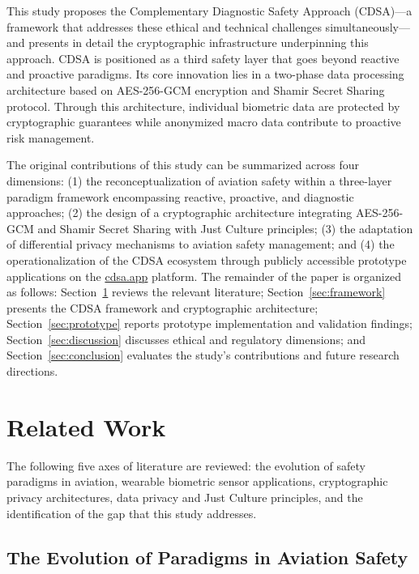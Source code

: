 \documentclass[12pt,a4paper]{article}
\begin{document}
This study proposes the Complementary Diagnostic Safety Approach (CDSA)---a framework that
addresses these ethical and technical challenges simultaneously---and presents in detail the
cryptographic infrastructure underpinning this approach. CDSA is positioned as a third safety
layer that goes beyond reactive and proactive paradigms. Its core innovation lies in a two-phase
data processing architecture based on AES-256-GCM encryption and Shamir Secret Sharing protocol.
Through this architecture, individual biometric data are protected by cryptographic guarantees
while anonymized macro data contribute to proactive risk management.

The original contributions of this study can be summarized across four dimensions:
(1) the reconceptualization of aviation safety within a three-layer paradigm framework
encompassing reactive, proactive, and diagnostic approaches;
(2) the design of a cryptographic architecture integrating AES-256-GCM and Shamir Secret
Sharing with Just Culture principles;
(3) the adaptation of differential privacy mechanisms to aviation safety management; and
(4) the operationalization of the CDSA ecosystem through publicly accessible prototype
applications on the \href{https://cdsa.app}{cdsa.app} platform.
The remainder of the paper is organized as follows: Section~\ref{sec:related} reviews the
relevant literature; Section~\ref{sec:framework} presents the CDSA framework and cryptographic
architecture; Section~\ref{sec:prototype} reports prototype implementation and validation findings;
Section~\ref{sec:discussion} discusses ethical and regulatory dimensions; and
Section~\ref{sec:conclusion} evaluates the study's contributions and future research directions.

\section{Related Work}
\label{sec:related}

The following five axes of literature are reviewed: the evolution of safety paradigms in
aviation, wearable biometric sensor applications, cryptographic privacy architectures, data
privacy and Just Culture principles, and the identification of the gap that this study addresses.

\subsection{The Evolution of Paradigms in Aviation Safety}
\end{document}
